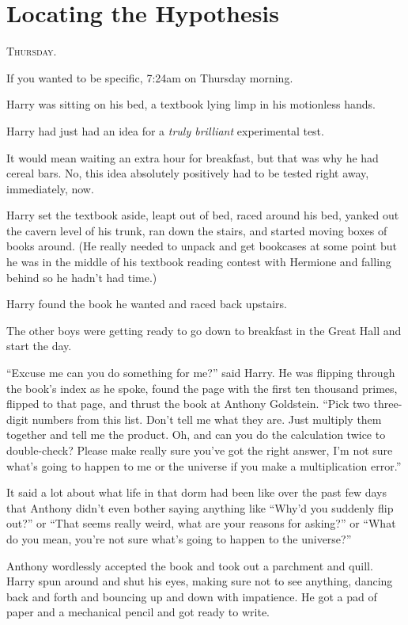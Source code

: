 \chapter{Locating the Hypothesis}

\lettrine{T}{hursday}.

\quad\quad
If you wanted to be specific, 7:24am on Thursday morning.

Harry was sitting on his bed, a textbook lying limp in his motionless hands.

Harry had just had an idea for a \emph{truly brilliant} experimental test.

It would mean waiting an extra hour for breakfast, but that was why he had cereal bars. No, this idea absolutely positively had to be tested right away, immediately, now.

Harry set the textbook aside, leapt out of bed, raced around his bed, yanked out the cavern level of his trunk, ran down the stairs, and started moving boxes of books around. (He really needed to unpack and get bookcases at some point but he was in the middle of his textbook reading contest with Hermione and falling behind so he hadn’t had time.)

Harry found the book he wanted and raced back upstairs.

The other boys were getting ready to go down to breakfast in the Great Hall and start the day.

“Excuse me can you do something for me?” said Harry. He was flipping through the book’s index as he spoke, found the page with the first ten thousand primes, flipped to that page, and thrust the book at Anthony Goldstein. “Pick two three-digit numbers from this list. Don’t tell me what they are. Just multiply them together and tell me the product. Oh, and can you do the calculation twice to double-check? Please make really sure you’ve got the right answer, I’m not sure what’s going to happen to me or the universe if you make a multiplication error.”

It said a lot about what life in that dorm had been like over the past few days that Anthony didn’t even bother saying anything like “Why’d you suddenly flip out?” or “That seems really weird, what are your reasons for asking?” or “What do you mean, you’re not sure what’s going to happen to the universe?”

Anthony wordlessly accepted the book and took out a parchment and quill. Harry spun around and shut his eyes, making sure not to see anything, dancing back and forth and bouncing up and down with impatience. He got a pad of paper and a mechanical pencil and got ready to write.


